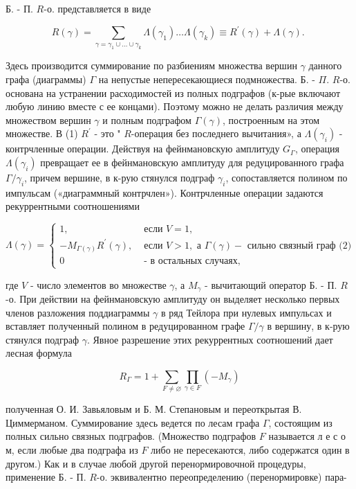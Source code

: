 \documentclass[10pt]{article}
\begin{document}
Б. - П. $R$-о. представляется в виде



\[

R(\gamma)=\sum_{\gamma=\gamma_{1} \cup \ldots \cup \gamma_{k}} \Lambda\left(\gamma_{1}\right) \ldots \Lambda\left(\gamma_{k}\right) \equiv R^{\prime}(\gamma)+\Lambda(\gamma) \text {. }

\]



Здесь производится суммирование по разбиениям множества вершин $\gamma$ данного графа (диаграммы) $\Gamma$ на непустые непересекающиеся подмножества. Б. - $\Pi$. $R$-о. основана на устранении расходимостей из полных подграфов (к-рые включают любую линию вместе с ее концами). Поэтому можно не делать различия между множеством вершин $\gamma$ и полным подграфом $\Gamma(\gamma)$, построенным на этом множестве. В (1) $R^{\prime}$ - это " $R$-операция без последнего вычитания», а $\Lambda\left(\gamma_{i}\right)$ - контрчленные операции. Действуя на фейнмановскую амплитуду $G_{\Gamma}$, операция $\Lambda\left(\gamma_{i}\right)$ превращает ее в фейнмановскую амплитуду для редуцированного графа $\Gamma / \gamma_{i}$, причем вершине, в к-рую стянулся подграф $\gamma_{i}$, сопоставляется полином по импульсам («диаграммный контрчлен»). Контрчленные операции задаются рекуррентными соотношениями



$\Lambda(\gamma)= \begin{cases}1, & \text { если } V=1, \\ -M_{\Gamma(\gamma)} R^{\prime}(\gamma), & \text { если } V>1, \text { а } \Gamma(\gamma)-\text { сильно связный граф (2) } \\ 0 & \text { - в остальных случаях, }\end{cases}$



где $V$ - число элементов во множестве $\gamma$, а $M_{\gamma}$ - вычитающий оператор Б. - П. $R$-о. При действии на фейнмановскую амплитуду он выделяет несколько первых членов разложения поддиаграммы $\gamma$ в ряд Тейлора при нулевых импульсах и вставляет полученный полином в редуцированном графе $\Gamma / \gamma$ в вершину, в к-рую стянулся подграф $\gamma$. Явное разрешение этих рекуррентных соотношений дает лесная формула



\[

R_{\Gamma}=1+\sum_{F \neq \varnothing} \prod_{\gamma \in F}\left(-M_{\gamma}\right)

\]



полученная О. И. Завьяловым и Б. М. Степановым и переоткрытая В. Циммерманом. Суммирование здесь ведется по лесам графа $\Gamma$, состоящим из полных сильно связных подграфов. (Множество подграфов $F$ называется л е с о м, если любые два подграфа из $F$ либо не пересекаются, либо содержатся один в другом.) Как и в случае любой другой перенормировочной процедуры, применение Б. - П. $R$-о. эквивалентно переопределению (перенормировке) пара-
\end{document}
